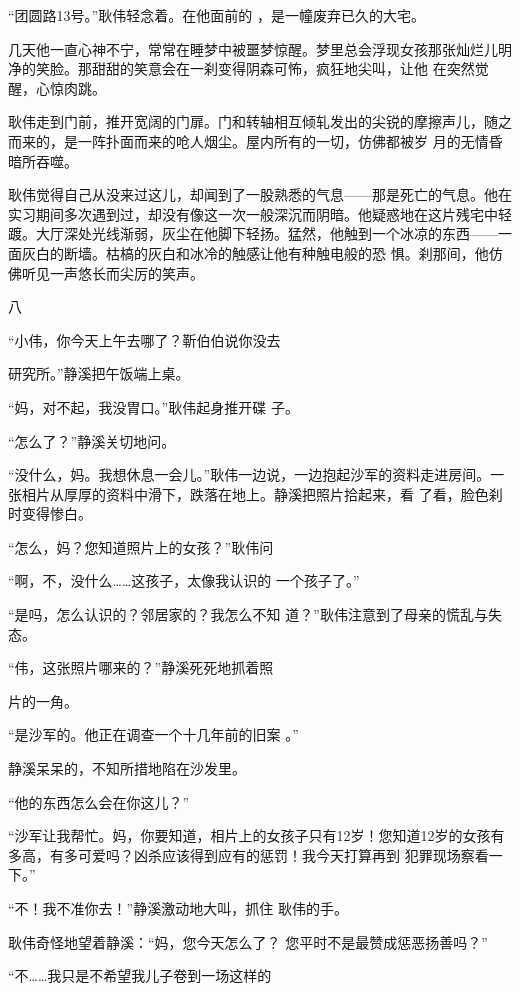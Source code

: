 \documentclass{article}
\begin{document}
“团圆路13号。”耿伟轻念着。在他面前的
，是一幢废弃已久的大宅。 

\newpage

几天他一直心神不宁，常常在睡梦中被噩梦惊醒。梦里总会浮现女孩那张灿烂儿明净的笑脸。那甜甜的笑意会在一刹变得阴森可怖，疯狂地尖叫，让他
在突然觉醒，心惊肉跳。 

耿伟走到门前，推开宽阔的门扉。门和转轴相互倾轧发出的尖锐的摩擦声儿，随之而来的，是一阵扑面而来的呛人烟尘。屋内所有的一切，仿佛都被岁
月的无情昏暗所吞噬。 

耿伟觉得自己从没来过这儿，却闻到了一股熟悉的气息——那是死亡的气息。他在实习期间多次遇到过，却没有像这一次一般深沉而阴暗。他疑惑地在这片残宅中轻踱。大厅深处光线渐弱，灰尘在他脚下轻扬。猛然，他触到一个冰凉的东西——一面灰白的断墙。枯槁的灰白和冰冷的触感让他有种触电般的恐
惧。刹那间，他仿佛听见一声悠长而尖厉的笑声。 


八 

“小伟，你今天上午去哪了？靳伯伯说你没去
\newpage

研究所。”静溪把午饭端上桌。 

“妈，对不起，我没胃口。”耿伟起身推开碟
子。 


“怎么了？”静溪关切地问。 

“没什么，妈。我想休息一会儿。”耿伟一边说，一边抱起沙军的资料走进房间。一张相片从厚厚的资料中滑下，跌落在地上。静溪把照片拾起来，看
了看，脸色刹时变得惨白。 

“怎么，妈？您知道照片上的女孩？”耿伟问

“啊，不，没什么……这孩子，太像我认识的
一个孩子了。” 

“是吗，怎么认识的？邻居家的？我怎么不知
道？”耿伟注意到了母亲的慌乱与失态。 

“伟，这张照片哪来的？”静溪死死地抓着照
\newpage

片的一角。 

“是沙军的。他正在调查一个十几年前的旧案
。” 


静溪呆呆的，不知所措地陷在沙发里。 


“他的东西怎么会在你这儿？” 

“沙军让我帮忙。妈，你要知道，相片上的女孩子只有12岁！您知道12岁的女孩有多高，有多可爱吗？凶杀应该得到应有的惩罚！我今天打算再到
犯罪现场察看一下。” 

“不！我不准你去！”静溪激动地大叫，抓住
耿伟的手。 

耿伟奇怪地望着静溪：“妈，您今天怎么了？
您平时不是最赞成惩恶扬善吗？” 

“不……我只是不希望我儿子卷到一场这样的
\newpage
\end{document}
